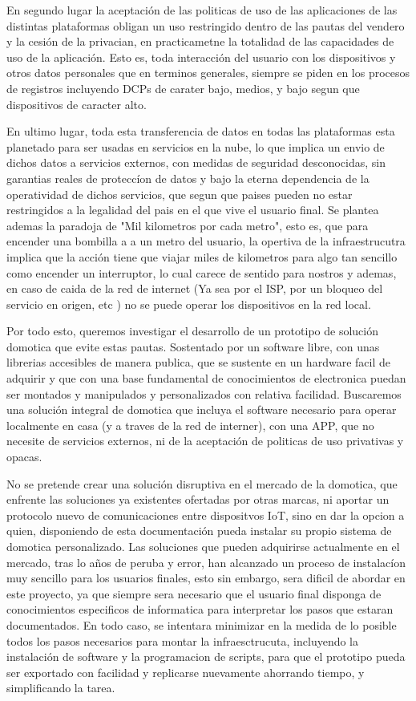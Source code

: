 En segundo lugar la aceptación de las politicas de uso de las aplicaciones de las distintas plataformas obligan un uso restringido dentro de las pautas del vendero y la cesión de la privacian, en practicametne la totalidad de las capacidades de uso de la aplicación. Esto es, toda interacción del usuario con los dispositivos y otros datos personales que en terminos generales, siempre se piden en los procesos de registros incluyendo DCPs de carater bajo, medios, y bajo segun que dispositivos de caracter alto.

En ultimo lugar, toda esta transferencia de datos en todas las plataformas esta planetado para ser usadas en servicios en la nube, lo que implica un envio de dichos datos a servicios externos, con medidas de seguridad desconocidas, sin garantias reales de proteccíon de datos y bajo la eterna dependencia de la operatividad de dichos servicios, que segun que paises pueden no estar restringidos a la legalidad del pais en el que vive el usuario final. Se plantea ademas la paradoja de "Mil kilometros por cada metro", esto es, que para encender una bombilla a a un metro del usuario, la opertiva de la infraestrucutra implica que la acción tiene que viajar miles de kilometros para algo tan sencillo como encender un interruptor, lo cual carece de sentido para nostros y ademas, en caso de caida de la red de internet (Ya sea por el ISP, por un bloqueo del servicio en origen, etc ) no se puede operar los dispositivos en la red local.


Por todo esto, queremos investigar el desarrollo de un prototipo de solución domotica que evite estas pautas. Sostentado por un software libre, con unas librerias accesibles de manera publica, que se sustente en un hardware facil de adquirir y que con una base fundamental de conocimientos de electronica puedan ser montados y manipulados y personalizados con relativa facilidad. Buscaremos una solución integral de domotica que incluya el software necesario para operar localmente en casa (y a traves de la red de interner), con una APP, que no necesite de servicios externos, ni de la aceptación de politicas de uso privativas y opacas.

No se pretende crear una solución disruptiva en el mercado de la domotica, que enfrente las soluciones ya existentes ofertadas por otras marcas, ni aportar un protocolo nuevo de comunicaciones entre dispositvos IoT, sino en dar la opcion a quien, disponiendo de esta documentación pueda instalar su propio sistema de domotica personalizado. Las soluciones que pueden adquirirse actualmente en el mercado, tras lo años de peruba y error, han alcanzado un proceso de instalacíon muy sencillo para los usuarios finales, esto sin embargo, sera dificil  de abordar en este proyecto, ya que siempre sera necesario que el usuario final disponga de conocimientos especificos de informatica para interpretar los pasos que estaran documentados. En todo caso, se intentara minimizar en la medida de lo posible todos los pasos necesarios para montar la infraesctrucuta, incluyendo la instalación de software y la programacion de scripts, para que el prototipo pueda ser exportado con facilidad y replicarse nuevamente ahorrando tiempo, y simplificando la tarea.

